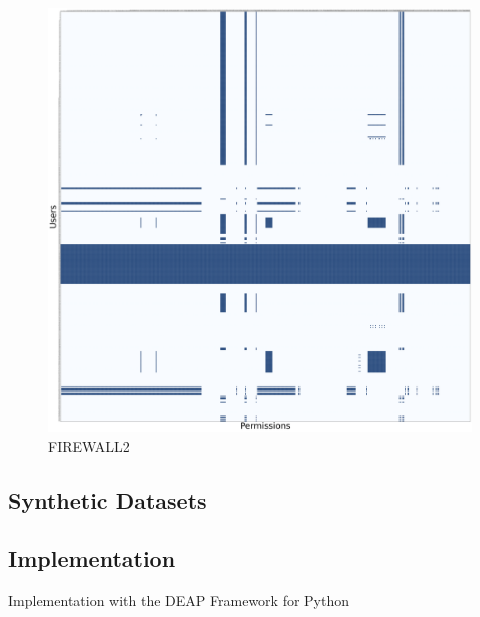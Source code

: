 \begin{figure}[H]
	\centering
	\includegraphics[scale=0.1]{./Figures/firewall2}
	\caption{FIREWALL2}
	\label{fig:firewall2}
\end{figure}

\subsection{Synthetic Datasets}
\label{sec:infoSyntheticDatasets}

\subsection{Implementation}
Implementation with the DEAP Framework for Python \cite{DeRainville:2012}